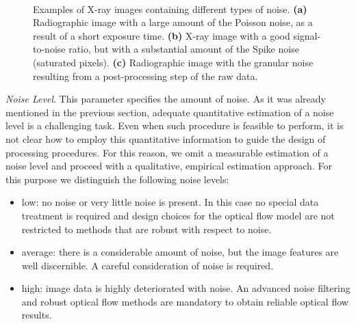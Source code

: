\\
\begin{figure}[ht]
	
	\centerline{
		\mbox{}
		\mbox{}
		\mbox{}
	} 
	\caption[]{Examples of X-ray images containing different types of noise. \textbf{(a)} Radiographic image with a large amount of the Poisson noise, as a result of a short exposure time. \textbf{(b)} X-ray image with a good signal-to-noise ratio, but with a substantial amount of the Spike noise (saturated pixels). \textbf{(c)} Radiographic image with the granular noise resulting from a post-processing step of the raw data.}
	\label{fig:noise_models}
\end{figure}

\textit{Noise Level}. This parameter specifies the amount of noise. As it was already mentioned in the previous section, adequate quantitative estimation of a noise level is a challenging task. Even when such procedure is feasible to perform, it is not clear how to employ this quantitative information to guide the design of processing procedures. For this reason, we omit a measurable estimation of a noise level and proceed with a qualitative, empirical estimation approach. For this purpose we distinguish the following noise levels: 
\begin{itemize}
	\item low: no noise or very little noise is present. In this case no special data treatment is required and design choices for the optical flow model are not restricted to methods that are robust with respect to noise.  
	
	\item average: there is a considerable amount of noise, but the image features are well discernible. A careful consideration of noise is required.
	
	\item high: image data is highly deteriorated with noise. An advanced noise filtering and robust optical flow methods are mandatory to obtain reliable optical flow results.
\end{itemize}

